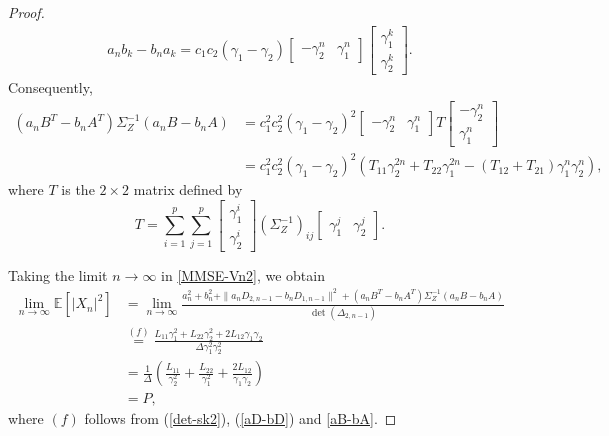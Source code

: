 \documentclass[12pt]{article}
\newcommand{\E}{\mathbb{E}}
\begin{document}
\begin{proof}
\begin{equation*}
\begin{aligned}
     a_nb_k -b_na_k = c_1c_2(\gamma_1-\gamma_2)\begin{bmatrix}-\gamma_2^n &\gamma_1^n\end{bmatrix} \begin{bmatrix}\gamma_1^k\\[2pt]\gamma_2^k\end{bmatrix}.
\end{aligned}  
\end{equation*}
Consequently,
\begin{equation}\label{aB-bA}
\begin{aligned}
     (a_nB^T-b_nA^T)\Sigma_Z^{-1}(a_nB-b_nA)&=c_1^2c_2^2(\gamma_1-\gamma_2)^2\begin{bmatrix}-\gamma_2^n &\gamma_1^n\end{bmatrix}T\begin{bmatrix}-\gamma_2^n \\[2pt]\gamma_1^n\end{bmatrix}\\
     &=c_1^2c_2^2(\gamma_1-\gamma_2)^2\left(T_{11}\gamma_2^{2n}+T_{22}\gamma_1^{2n}-(T_{12}+T_{21})\gamma_1^n\gamma_2^n\right),
\end{aligned}  
\end{equation}
where $T$ is the $2 \times 2$ matrix defined by
\[
T = \sum_{i=1}^p \sum_{j=1}^p
\begin{bmatrix} \gamma_1^i \\[2pt] \gamma_2^i \end{bmatrix}
(\Sigma_Z^{-1})_{ij}
\begin{bmatrix} \gamma_1^j & \gamma_2^j \end{bmatrix}.
\]

Taking the limit $n \to \infty$ in \eqref{MMSE-Vn2}, we obtain
\begin{equation}\label{power-eqn-sk2-proof}
   \begin{aligned}
      \lim_{n\to\infty}\E[|X_n|^2]%
      &=\lim_{n\to\infty}\frac{a_n^2+b_n^2+\|a_nD_{2,n-1}-b_nD_{1,n-1}\|^2 +(a_nB^T-b_nA^T)\Sigma_Z^{-1}(a_nB-b_nA)}{\det(\Delta_{2,n-1})}\\
      &\overset{(f)}{=}\frac{L_{11}\gamma_1^2 +L_{22}\gamma_2^2+2L_{12}\gamma_1\gamma_2}{\Delta \gamma_1^2\gamma_2^2}\\
      &=\frac{1}{\Delta}\left(\frac{L_{11}}{\gamma_2^2}+\frac{L_{22}}{\gamma_1^2}+\frac{2L_{12}}{\gamma_1\gamma_2}\right)\\
      &= P,
   \end{aligned}
\end{equation}
where $(f)$ follows from (\ref{det-sk2}), (\ref{aD-bD}) and \eqref{aB-bA}. 


\end{proof}
\end{document}
